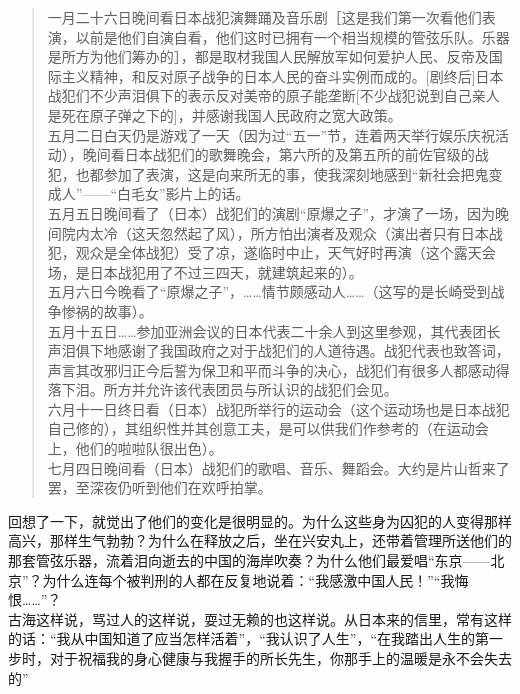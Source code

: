 \begin{quote}
	一月二十六日晚间看日本战犯演舞踊及音乐剧［这是我们第一次看他们表演，以前是他们自演自看，他们这时已拥有一个相当规模的管弦乐队。乐器是所方为他们筹办的］，都是取材我国人民解放军如何爱护人民、反帝及国际主义精神，和反对原子战争的日本人民的奋斗实例而成的。[剧终后]日本战犯们不少声泪俱下的表示反对美帝的原子能垄断[不少战犯说到自己亲人是死在原子弹之下的]，并感谢我国人民政府之宽大政策。\\

五月二日白天仍是游戏了一天（因为过“五一”节，连着两天举行娱乐庆祝活动），晚间看日本战犯们的歌舞晚会，第六所的及第五所的前佐官级的战犯，也都参加了表演，这是向来所无的事，使我深刻地感到“新社会把鬼变成人”——“白毛女”影片上的话。\\

五月五日晚间看了（日本）战犯们的演剧“原爆之子”，才演了一场，因为晚间院内太冷（这天忽然起了风），所方怕出演者及观众（演出者只有日本战犯，观众是全体战犯）受了凉，遂临时中止，天气好时再演（这个露天会场，是日本战犯用了不过三四天，就建筑起来的）。\\

五月六日今晚看了“原爆之子”，……情节颇感动人……（这写的是长崎受到战争惨祸的故事）。\\

五月十五日……参加亚洲会议的日本代表二十余人到这里参观，其代表团长声泪俱下地感谢了我国政府之对于战犯们的人道待遇。战犯代表也致答词，声言其改邪归正今后誓为保卫和平而斗争的决心，战犯们有很多人都感动得落下泪。所方并允许该代表团员与所认识的战犯们会见。\\

六月十一日终日看（日本）战犯所举行的运动会（这个运动场也是日本战犯自己修的），其组织性并其创意工夫，是可以供我们作参考的（在运动会上，他们的啦啦队很出色）。\\

七月四日晚间看（日本）战犯们的歌唱、音乐、舞蹈会。大约是片山哲来了罢，至深夜仍听到他们在欢呼拍掌。\\
\end{quote}

回想了一下，就觉出了他们的变化是很明显的。为什么这些身为囚犯的人变得那样高兴，那样生气勃勃？为什么在释放之后，坐在兴安丸上，还带着管理所送他们的那套管弦乐器，流着泪向逝去的中国的海岸吹奏？为什么他们最爱唱“东京——北京”？为什么连每个被判刑的人都在反复地说着：“我感激中国人民！”“我悔恨……”？\\

古海这样说，骂过人的这样说，耍过无赖的也这样说。从日本来的信里，常有这样的话：“我从中国知道了应当怎样活着”，“我认识了人生”，“在我踏出人生的第一步时，对于祝福我的身心健康与我握手的所长先生，你那手上的温暖是永不会失去的”\\

